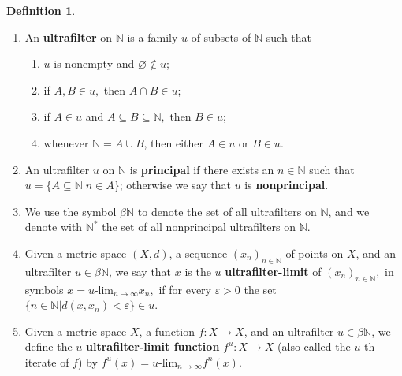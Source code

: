 \documentclass[12pt]{amsart}
\theoremstyle{definition}
\newtheorem{definition}[theorem]{Definition}
\numberwithin{equation}{section}
\begin{document}
\begin{definition}\hfill
\begin{enumerate}
\item An {\bf ultrafilter} on $\mathbb N$ is a family $u$ of subsets of $\mathbb N$ such that
\begin{enumerate}
\item $u$ is nonempty and $\varnothing\notin u$;
\item if $A,B\in u,$ then $A\cap B\in u$;
\item if $A\in u$ and $A\subseteq B\subseteq \mathbb N,$ then $B\in u$;
\item whenever $\mathbb N=A\cup B$, then either $A\in u$ or $B\in u$.
\end{enumerate}
\item An ultrafilter $u$ on $\mathbb N$ is {\bf principal} if there exists an $n\in\mathbb N$ such that 
        $u=\{A\subseteq\mathbb N\big|n\in A\}$; otherwise we say that $u$ is {\bf nonprincipal}.
\item We use the symbol $\beta\mathbb N$ to denote the set of all ultrafilters on $\mathbb N$, and we denote 
        with $\mathbb N^*$ the set of all nonprincipal ultrafilters on $\mathbb N$.
\item Given a metric space $(X,d)$, a sequence $(x_n)_{n\in\mathbb N}$ of points on $X$, and an ultrafilter 
         $u\in\beta\mathbb N$, we say that $x$ is the $u$ {\bf ultrafilter-limit} of $(x_n)_{n\in\mathbb N},$ in
         symbols $x=u\text{-lim}_{n\to\infty}x_n,$ if for every $\varepsilon>0$ the set 
         $\{n\in\mathbb N\big|d(x,x_n)<\varepsilon\}\in u$.
\item Given a metric space $X$, a function $f \colon X\longrightarrow X$, and an ultrafilter $u\in\beta\mathbb N$, 
         we define the $u$ {\bf ultrafilter-limit function} $f^u\colon X\longrightarrow X$ (also called the $u$-th iterate 
         of $f$) by $f^u(x)=u\text{-lim}_{n\to\infty}f^n(x)$.
\end{enumerate}
\end{definition}
\end{document}
